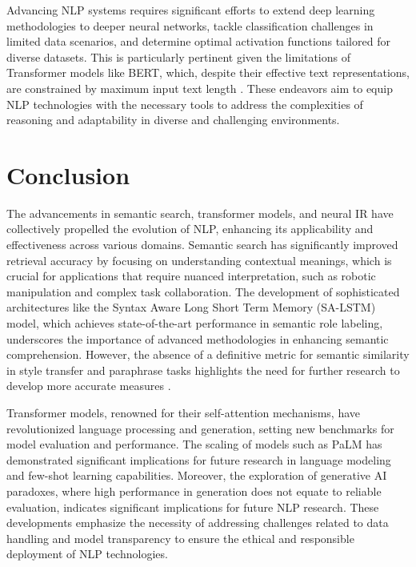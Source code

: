 Advancing NLP systems requires significant efforts to extend deep learning methodologies to deeper neural networks, tackle classification challenges in limited data scenarios, and determine optimal activation functions tailored for diverse datasets. This is particularly pertinent given the limitations of Transformer models like BERT, which, despite their effective text representations, are constrained by maximum input text length \cite{ginzburg2021selfsuperviseddocumentsimilarityranking}. These endeavors aim to equip NLP technologies with the necessary tools to address the complexities of reasoning and adaptability in diverse and challenging environments.









\section{Conclusion} \label{sec:Conclusion}





The advancements in semantic search, transformer models, and neural IR have collectively propelled the evolution of NLP, enhancing its applicability and effectiveness across various domains. Semantic search has significantly improved retrieval accuracy by focusing on understanding contextual meanings, which is crucial for applications that require nuanced interpretation, such as robotic manipulation and complex task collaboration. The development of sophisticated architectures like the Syntax Aware Long Short Term Memory (SA-LSTM) model, which achieves state-of-the-art performance in semantic role labeling, underscores the importance of advanced methodologies in enhancing semantic comprehension. However, the absence of a definitive metric for semantic similarity in style transfer and paraphrase tasks highlights the need for further research to develop more accurate measures \cite{yamshchikov2020styletransferparaphraselookingsensible}.



Transformer models, renowned for their self-attention mechanisms, have revolutionized language processing and generation, setting new benchmarks for model evaluation and performance. The scaling of models such as PaLM has demonstrated significant implications for future research in language modeling and few-shot learning capabilities. Moreover, the exploration of generative AI paradoxes, where high performance in generation does not equate to reliable evaluation, indicates significant implications for future NLP research. These developments emphasize the necessity of addressing challenges related to data handling and model transparency to ensure the ethical and responsible deployment of NLP technologies.



